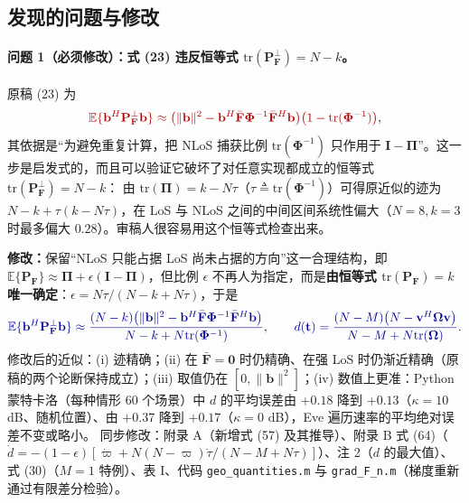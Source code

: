 \documentclass[11pt,a4paper]{ctexart}
\newcommand{\code}[1]{\texttt{#1}}
\newcommand{\old}[1]{{\color{red!70!black}#1}}
\newcommand{\new}[1]{{\color{blue!60!black}#1}}
\newcommand{\bOm}{\bm\Omega}
\newcommand{\bPhi}{\bm\Phi}
\newcommand{\tr}{\mathrm{tr}}
\begin{document}
\subsection{发现的问题与修改}
\paragraph{问题 1（必须修改）：式 (23) 违反恒等式 $\tr(\mathbf P_{\mathbf F}^\perp)=N-k$。}
原稿 (23) 为
\[
\old{\mathbb E\{\mathbf b^H\mathbf P_{\mathbf F}^\perp\mathbf b\}\approx\big(\|\mathbf b\|^2-\mathbf b^H\bar{\mathbf F}\bPhi^{-1}\bar{\mathbf F}^H\mathbf b\big)\big(1-\tr(\bPhi^{-1})\big)},
\]
其依据是“为避免重复计算，把 NLoS 捕获比例 $\tr(\bPhi^{-1})$ 只作用于 $\mathbf I-\bm\Pi$”。这一步是启发式的，而且可以验证它破坏了对任意实现都成立的恒等式 $\tr(\mathbf P_{\mathbf F}^\perp)=N-k$：
由 $\tr(\bm\Pi)=k-N\tau$（$\tau\triangleq\tr(\bPhi^{-1})$）可得原近似的迹为 $N-k+\tau(k-N\tau)$，在 LoS 与 NLoS 之间的中间区间系统性偏大（$N=8,k=3$ 时最多偏大 $0.28$）。审稿人很容易用这个恒等式检查出来。

\textbf{修改：}保留“NLoS 只能占据 LoS 尚未占据的方向”这一合理结构，即 $\mathbb E\{\mathbf P_{\mathbf F}\}\approx\bm\Pi+\epsilon(\mathbf I-\bm\Pi)$，但比例 $\epsilon$ 不再人为指定，而是\textbf{由恒等式 $\tr(\mathbf P_{\mathbf F})=k$ 唯一确定}：$\epsilon=N\tau/(N-k+N\tau)$，于是
\[
\new{\mathbb E\{\mathbf b^H\mathbf P_{\mathbf F}^\perp\mathbf b\}\approx\frac{(N-k)\big(\|\mathbf b\|^2-\mathbf b^H\bar{\mathbf F}\bPhi^{-1}\bar{\mathbf F}^H\mathbf b\big)}{N-k+N\tr(\bPhi^{-1})}},\qquad
\new{d(\mathbf t)=\frac{(N-M)\big(N-\mathbf v^H\bOm\mathbf v\big)}{N-M+N\tr(\bOm)}}.
\]
修改后的近似：(i) 迹精确；(ii) 在 $\bar{\mathbf F}=\mathbf 0$ 时仍精确、在强 LoS 时仍渐近精确（原稿的两个论断保持成立）；(iii) 取值仍在 $[0,\|\mathbf b\|^2]$；(iv) 数值上更准：Python 蒙特卡洛（每种情形 60 个场景）中 $d$ 的平均误差由 $+0.18$ 降到 $+0.13$（$\kappa=10$ dB、随机位置）、由 $+0.37$ 降到 $+0.17$（$\kappa=0$ dB），Eve 遍历速率的平均绝对误差不变或略小。
同步修改：附录 A（新增式 (57) 及其推导）、附录 B 式 (64)（$\dot d=-(1-\epsilon)[\dot\varpi+N(N-\varpi)\dot\tau/(N-M+N\tau)]$）、注 2（$d$ 的最大值）、式 (30)（$M=1$ 特例）、表 I、代码 \code{geo\_quantities.m} 与 \code{grad\_F\_n.m}（梯度重新通过有限差分检验）。
\end{document}
